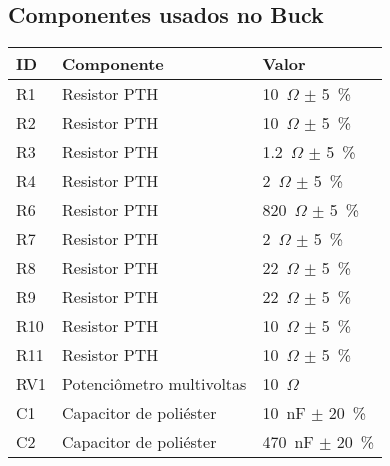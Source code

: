 \begin{apendicesenv}
	\partapendices

	\chapter{Componentes usados no Buck \interleaved}
	
	    \begin{table}[htbp]
	        \centering
	        \begin{tabular}{@{}|m{}|m{}|m{}|@{}}
	            \hline
	            ID & Componente & Valor \\
	            \hline
	            R1  &   Resistor PTH                &   \qty{10}{\kilo$\Omega$} $\pm$ \qty{5}{\percent}\\ %
	            R2	&	Resistor PTH	            &	\qty{10}{\kilo$\Omega$} $\pm$ \qty{5}{\percent}\\
	            R3	&	Resistor PTH	            &	\qty{1.2}{\kilo$\Omega$} $\pm$ \qty{5}{\percent}\\
	            R4	&	Resistor PTH	            &	\qty{2}{\kilo$\Omega$} $\pm$ \qty{5}{\percent}\\
	            R6	&	Resistor PTH	            &	\qty{820}{$\Omega$} $\pm$ \qty{5}{\percent}\\
	            R7	&	Resistor PTH	            &	\qty{2}{\kilo$\Omega$} $\pm$ \qty{5}{\percent}\\
	            R8	&	Resistor PTH	            &	\qty{22}{$\Omega$} $\pm$ \qty{5}{\percent}\\
	            R9	&	Resistor PTH	            &	\qty{22}{$\Omega$} $\pm$ \qty{5}{\percent}\\
	            R10	&	Resistor PTH	            &	\qty{10}{\kilo$\Omega$} $\pm$ \qty{5}{\percent}\\
	            R11	&	Resistor PTH	            &	\qty{10}{\kilo$\Omega$} $\pm$ \qty{5}{\percent}\\
	            RV1	&	Potenciômetro multivoltas	&	\qty{10}{\kilo$\Omega$} \\
	            C1	&	Capacitor de poliéster	    &	\qty{10}{\nano\farad} $\pm$ \qty{20}{\percent}\\
	            C2	&	Capacitor de poliéster	    &	\qty{470}{\nano\farad} $\pm$ \qty{20}{\percent}\\

\end{tabular}
\end{table}
\end{apendicesenv}

